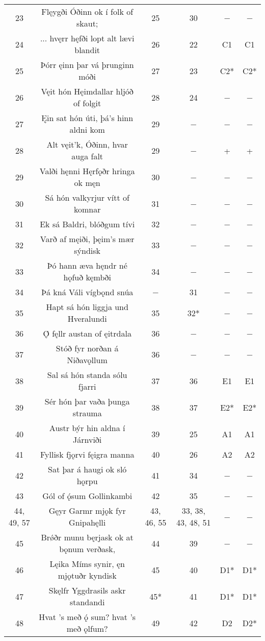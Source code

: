 {\begin{longtable}{|c c c c c c|}
	23 & Flęygði Óðinn ok í folk of skaut; & 25 & 30 & − & − \\
	24 & ... hvęrr hęfði lopt alt lævi blandit  & 26 & 22 & C1 & C1 \\
	25 & Þórr ęinn þar vá þrunginn móði & 27 & 23 & C2* & C2* \\
	26 & Vęit hón Hęimdallar hljóð of folgit & 28 & 24 & − & − \\
	27 & Ęin sat hón úti, þá’s hinn aldni kom & 29 & − & − & − \\
	28 & Alt vęit’k, Óðinn, hvar auga falt & 29 & − & + & + \\
	29 & Valði hęnni Hęrfǫðr hringa ok męn & 30 & − & − & − \\
	30 & Sá hón valkyrjur vítt of komnar & 31 & − & − & − \\
	31 & Ek sá Baldri, blóðgum tívi & 32 & − & − & − \\
	32 & Varð af męiði, þęim’s mær sýndisk & 33 & − & − & − \\
	33 & Þó hann æva hęndr né hǫfuð kęmbði & 34 & − & − & − \\
	34 & Þá kná Váli vígbǫnd snúa & − & 31 & − & − \\
	35 & Hapt sá hón liggja und Hveralundi & 35 & 32* & − & − \\
	36 & Ǫ́ fęllr austan of ęitrdala & 36 & − & − & − \\
	37 & Stóð fyr norðan á Niðavǫllum & 36 & − & − & − \\
	38 & Sal sá hón standa sólu fjarri & 37 & 36 & E1 & E1 \\
	39 & Sér hón þar vaða þunga strauma & 38 & 37 & E2* & E2* \\
	40 & Austr býr hin aldna í Járnviði & 39 & 25 & A1 & A1 \\
	41 & Fyllisk fjǫrvi fęigra manna & 40 & 26 & A2 & A2 \\
	42 & Sat þar á haugi ok sló hǫrpu & 41 & 34 & − & − \\
	43 & Gól of ǫ́sum Gollinkambi & 42 & 35 & − & − \\
	44, 49, 57 & Gęyr Garmr mjǫk fyr Gnipahęlli & 43, 46, 55 & 33, 38, 43, 48, 51 & − & − \\
	45 & Brǿðr munu bęrjask ok at bǫnum verðask, & 44 & 39 & − & − \\
	46 & Lęika Míms synir, ęn mjǫtuðr kyndisk & 45 & 40 & D1* & D1* \\
	47 & Skęlfr Yggdrasils askr standandi & 45* & 41 & D1* & D1* \\
	48 & Hvat ’s með ǫ́ sum? hvat ’s með ǫlfum? & 49 & 42 & D2 & D2* \\

\end{longtable}}
